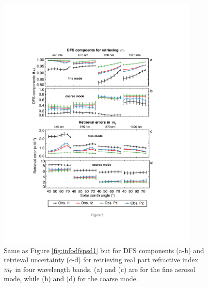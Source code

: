 \begin{figure}[p]
  \centering
  \includegraphics[width={0.9\textwidth}]{figures/info07.pdf}
  \caption [Same as Figure \ref{fig:infodfspsd1} but for DFS components
and retrieval uncertainty for retrieving real part refractive
index.]
  {Same as Figure \ref{fig:infodfspsd1} but for DFS components (a-b) and 
retrieval uncertainty (c-d) for retrieving real part refractive index $m_\text{r}$
in four wavelength bands. (a) and (c) are for the fine aerosol mode, while 
(b) and (d) for the coarse mode. }
  \label{fig:infodfsmr}
\end{figure}

